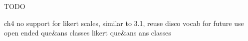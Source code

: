 TODO

ch4
no support for likert scales, similar to 3.1, reuse disco vocab for future use
open ended que&ans classes
likert que&ans ans classes

